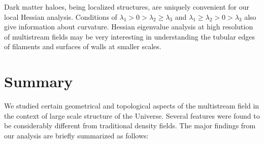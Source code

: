 Dark matter haloes, being localized structures, are uniquely convenient for our local Hessian analysis. Conditions of $\lambda_1 > 0 > \lambda_2 \geq \lambda_3 $ and $\lambda_1 \geq \lambda_2 > 0 > \lambda_3 $ also give information about curvature. Hessian eigenvalue analysis at high resolution of multistream fields may be very interesting in understanding the tubular edges of filaments and surfaces of walls at smaller scales. 

\section{Summary}
\label{sec:summary}

We studied certain geometrical and topological aspects of the multistream field in the context of large scale structure of the Universe. Several features were found to be considerably different from traditional density fields. The major findings from our analysis are briefly summarized as follows: 

